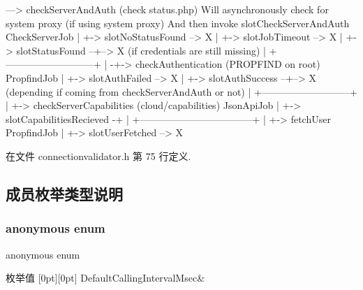 \begin{DoxyCode}
---> checkServerAndAuth  (check status.php)
       Will asynchronously check for system proxy (if using system proxy)
       And then invoke slotCheckServerAndAuth
       CheckServerJob
       |
       +-> slotNoStatusFound --> X
       |
       +-> slotJobTimeout --> X
       |
       +-> slotStatusFound --+--> X (if credentials are still missing)
                             |
 +---------------------------+
 |
-+-> checkAuthentication (PROPFIND on root)
       PropfindJob
       |
       +-> slotAuthFailed --> X
       |
       +-> slotAuthSuccess --+--> X (depending if coming from checkServerAndAuth or not)
                             |
 +---------------------------+
 |
 +-> checkServerCapabilities (cloud/capabilities)
       JsonApiJob
       |
       +-> slotCapabilitiesRecieved -+
                                     |
 +-----------------------------------+
 |
 +-> fetchUser
       PropfindJob
       |
       +-> slotUserFetched --> X
\end{DoxyCode}
 

在文件 connectionvalidator.\+h 第 75 行定义.



\subsection{成员枚举类型说明}
\mbox{\label{class_o_c_c_1_1_connection_validator_a641b1de72c72fe6d9132f5a8a9857eb5}} 
\subsubsection{\texorpdfstring{anonymous enum}{anonymous enum}}
{\footnotesize\ttfamily anonymous enum}

\begin{DoxyEnumFields}{枚举值}
[0pt][0pt]{}\mbox{\label{class_o_c_c_1_1_connection_validator_a641b1de72c72fe6d9132f5a8a9857eb5adaea5cd1ca3bd0fb9b2d3d86556972d0}} 
Default\+Calling\+Interval\+Msec&\\
\hline

\end{DoxyEnumFields}


